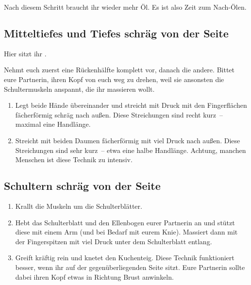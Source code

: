 Nach diesem Schritt braucht ihr wieder mehr Öl. Es ist also Zeit zum Nach-Ölen.

\subsection{Mitteltiefes und Tiefes schräg von der Seite}

Hier sitzt ihr .

Nehmt euch zuerst eine Rückenhälfte komplett vor, danach die andere. Bittet eure Partnerin, ihren Kopf von euch weg zu drehen, weil sie ansonsten die Schultermuskeln anspannt, die ihr massieren wollt.

\begin{oframed}
  \begin{enumerate}
    \item {} Legt beide Hände übereinander und streicht mit Druck mit den Fingerflächen fächerförmig schräg nach außen. Diese Streichungen sind recht kurz~-- maximal eine Handlänge.
    \item {} Streicht mit beiden Daumen fächerförmig mit viel Druck nach außen. Diese Streichungen sind sehr kurz~-- etwa eine halbe Handlänge. Achtung, manchen Menschen ist diese Technik zu intensiv.
  \end{enumerate}
\end{oframed}

\subsection{Schultern schräg von der Seite}

\begin{oframed}
  \begin{enumerate}
    \item {} Krallt die Muskeln um die Schulterblätter.
    \item {} Hebt das Schulterblatt und den Ellenbogen eurer Partnerin an und stützt diese mit einem Arm (und bei Bedarf mit eurem Knie). Massiert dann mit der Fingerspitzen mit viel Druck unter dem Schulterblatt entlang.
    \item {} Greift kräftig rein und knetet den Kuchenteig. Diese Technik funktioniert  besser, wenn ihr auf der gegenüberliegenden Seite sitzt. Eure Partnerin sollte dabei ihren Kopf etwas in Richtung Brust anwinkeln.
  \end{enumerate}
\end{oframed}


